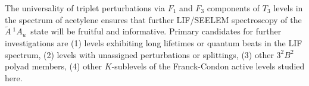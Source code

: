 \documentclass[12pt,draft]{mitthesis}
\newcommand{\POINT}[1]{\textcolor{magenta}{\textbf{POINT:} #1}}
\newcommand{\astate}{$
  \tilde{A} \: ^1\!A_u
  $}
\begin{document}

The universality of triplet perturbations via $F_1$ and $F_3$
components of $T_3$ levels in the spectrum of acetylene ensures that
further LIF/SEELEM spectroscopy of the \astate\ state will be fruitful
and informative.  Primary candidates for further investigations are
(1) levels exhibiting long lifetimes or quantum beats in the LIF
spectrum, (2) levels with unassigned perturbations or splittings, (3)
other $3^2B^2$ polyad members, (4) other $K$-sublevels of the
Franck-Condon active levels studied here.



\end{document}
